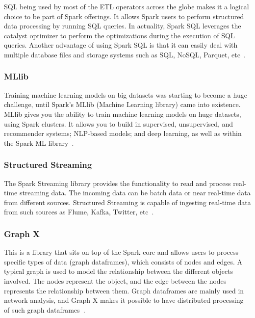 \documentclass[]{final_report}
\begin{document}
SQL being used by most of the ETL operators across the globe makes it a logical choice to be part of Spark offerings. It allows Spark users to perform structured data processing by running SQL queries. In actuality, Spark SQL leverages the catalyst optimizer to perform the optimizations during the execution of SQL queries. Another advantage of using Spark SQL is that it can easily deal with multiple database files and storage systems such as SQL, NoSQL, Parquet, etc~\cite{singh_manage_2022}.

\subsubsection{MLlib}

Training machine learning models on big datasets was starting to become a huge challenge, until Spark’s MLlib (Machine Learning library) came into existence. MLlib gives you the ability to train machine learning models on
huge datasets, using Spark clusters. It allows you to build in supervised, unsupervised, and recommender systems; NLP-based models; and deep learning, as well as within the Spark ML library~\cite{singh_manage_2022}.

\subsubsection{Structured Streaming}

The Spark Streaming library provides the functionality to read and process real-time streaming data. The incoming data can be batch data or near real-time data from different sources. Structured Streaming is capable of ingesting real-time data from such sources as Flume, Kafka, Twitter, etc~\cite{singh_manage_2022}.

\subsubsection{Graph X}

This is a library that sits on top of the Spark core and allows users to process specific types of data (graph dataframes), which consists of nodes and edges. A typical graph is used to model the relationship between the different objects involved. The nodes represent the object, and the edge between the nodes represents the relationship between them. Graph dataframes are mainly used in network analysis, and Graph X makes it possible to have distributed processing of such graph dataframes~\cite{singh_manage_2022}.
\end{document}
